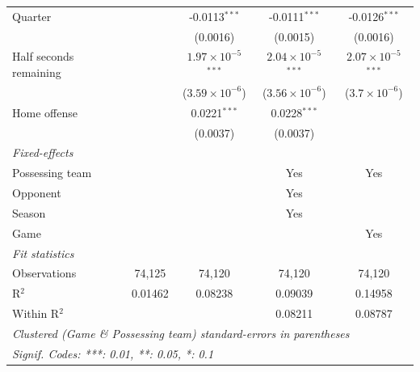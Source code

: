 \begin{table}[htbp]
\begin{tabular}{lcccc}
      Quarter                                 &                & -0.0113$^{***}$               & -0.0111$^{***}$               & -0.0126$^{***}$\\   
                                              &                & (0.0016)                      & (0.0015)                      & (0.0016)\\   
      Half seconds remaining                  &                & $1.97\times 10^{-5}$$^{***}$  & $2.04\times 10^{-5}$$^{***}$  & $2.07\times 10^{-5}$$^{***}$\\    
                                              &                & ($3.59\times 10^{-6}$)        & ($3.56\times 10^{-6}$)        & ($3.7\times 10^{-6}$)\\    
      Home offense                            &                & 0.0221$^{***}$                & 0.0228$^{***}$                &   \\   
                                              &                & (0.0037)                      & (0.0037)                      &   \\   
      \midrule
      \emph{Fixed-effects}\\
      Possessing team                         &                &                               & Yes                           & Yes\\  
      Opponent                                &                &                               & Yes                           & \\  
      Season                                  &                &                               & Yes                           & \\  
      Game                                    &                &                               &                               & Yes\\  
      \midrule
      \emph{Fit statistics}\\
      Observations                            & 74,125         & 74,120                        & 74,120                        & 74,120\\  
      R$^2$                                   & 0.01462        & 0.08238                       & 0.09039                       & 0.14958\\  
      Within R$^2$                            &                &                               & 0.08211                       & 0.08787\\  
      \midrule \midrule
      \multicolumn{5}{l}{\emph{Clustered (Game \& Possessing team) standard-errors in parentheses}}\\
      \multicolumn{5}{l}{\emph{Signif. Codes: ***: 0.01, **: 0.05, *: 0.1}}\\
   \end{tabular}
\end{table}


